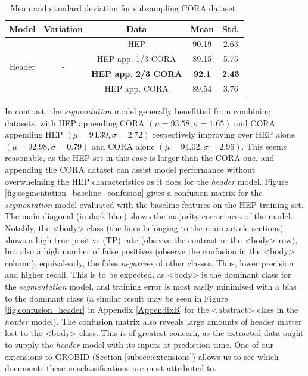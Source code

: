 \begin{table}[t]
\begin{center}
\begin{tabular}{|c|c|c|c|c|}
\hline
Model & Variation & Data & Mean & Std.\\
\hline
\multirow{4}{*}{Header} & \multirow{4}{*}{-} & HEP & 90.19 & 2.63\\\cline{3-5}
& & HEP app. 1/3 CORA & 89.15 & 5.75\\\cline{3-5}
& & \textbf{HEP app. 2/3 CORA} & \textbf{92.1} & \textbf{2.43}\\\cline{3-5}
& & HEP app. CORA & 89.54 & 3.76\\\cline{3-5}
\hline
\end{tabular}
\caption{Mean and standard deviation for subsampling CORA dataset.}
\label{table:subsampling}
\end{center}
\end{table}

In contrast, the \emph{segmentation} model generally benefitted from combining datasets, with HEP appending CORA $(\mu = 93.58, \sigma = 1.65)$ and CORA appending HEP $(\mu = 94.39, \sigma = 2.72)$ respectively improving over HEP alone $(\mu = 92.98, \sigma = 0.79)$ and CORA alone $(\mu = 94.02, \sigma = 2.96)$. This seems reasonable, as the HEP set in this case is larger than the CORA one, and appending the CORA dataset can assist model performance without overwhelming the HEP characteristics as it does for the \emph{header} model. Figure \ref{fig:segmentation_baseline_confusion} gives a confusion matrix for the \emph{segmentation} model evaluated with the baseline features on the HEP training set. The main diagonal (in dark blue) shows the majority correctness of the model. Notably, the <body> class (the lines belonging to the main article sections) shows a high true positive (TP) rate (observe the contrast in the <body> row), but also a high number of false positives (observe the confusion in the <body> column), equivalently, the false \emph{negatives} of other classes. Thus, lower precision and higher recall. This is to be expected, as <body> is the dominant class for the \emph{segmentation} model, and training error is most easily minimised with a bias to the dominant class (a similar result may be seen in Figure \ref{fig:confusion_header} in Appendix \ref{AppendixB} for the <abstract> class in the \emph{header} model). The confusion matrix also reveals large amounts of header matter lost to the <body> class. This is of greatest concern, as the extracted data ought to supply the \emph{header} model with its inputs at prediction time. One of our extensions to GROBID (Section \ref{subsec:extensions}) allows us to see which documents these misclassifications are most attributed to.

